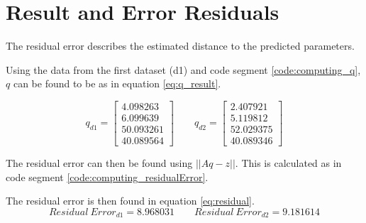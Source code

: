 \section{Result and Error Residuals}
The residual error describes the estimated distance to the predicted parameters.



Using the data from the first dataset (d1) and code segment \ref{code:computing_q}, $q$ can be found to be as in equation \ref{eq:q_result}.



        
        
 

\begin{equation}
q_{d1} = 
\left[
\begin{array}{c}
4.098263 \\
6.099639 \\
50.093261 \\
40.089564
\end{array}
\right]
% 
\qquad
% 
q_{d2} = 
\left[
\begin{array}{c}
2.407921\\
5.119812\\
52.029375\\ 
40.089346
\end{array}
\right]
\label{eq:q_result}
\end{equation}

The residual error can then be found using $|| Aq - z ||$.
This is calculated as in code segment \ref{code:computing_residualError}.



The residual error is then found in equation \ref{eq:residual}.
\begin{equation}
Residual\ Error_{d1} = 8.968031 
% 
\qquad
% 
Residual\ Error_{d2} = 9.181614
\label{eq:residual}
\end{equation}

